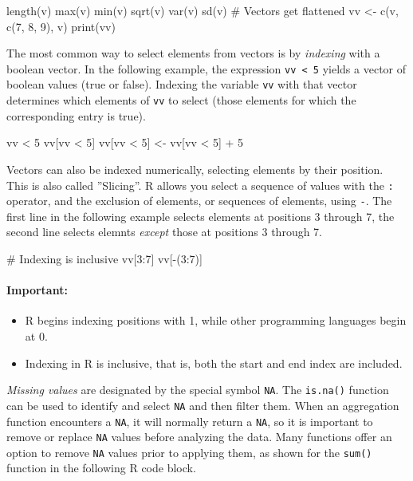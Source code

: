 \begin{samepage}
\begin{Rcode}
length(v)
max(v)
min(v)
sqrt(v)
var(v)
sd(v)
# Vectors get flattened
vv <- c(v, c(7, 8, 9), v)
print(vv)
\end{Rcode}
\end{samepage}

The most common way to select elements from vectors is by \emph{indexing} with a boolean vector. In the following example, the expression \texttt{vv < 5} yields a vector of boolean values (true or false). Indexing the variable \texttt{vv} with that vector determines which elements of \texttt{vv} to select (those elements for which the corresponding entry is true).

\begin{samepage}
\begin{Rcode}
vv < 5
vv[vv < 5]
vv[vv < 5] <- vv[vv < 5] + 5
\end{Rcode}
\end{samepage}

Vectors can also be indexed numerically, selecting elements by their position. This is also called ''Slicing''. R allows you select a sequence of values with the \texttt{:} operator, and the exclusion of elements, or sequences of elements, using \texttt{-}. The first line in the following example selects elements at positions 3 through 7, the second line selects elemnts \emph{except} those at positions 3 through 7.

\begin{samepage}
\begin{Rcode}
# Indexing is inclusive
vv[3:7]
vv[-(3:7)]
\end{Rcode}
\end{samepage}

\begin{tcolorbox}[colback=alert]
\paragraph*{Important:}
\begin{itemize}
   \item R begins indexing positions with 1, while other programming languages begin at 0.
   \item Indexing in R is inclusive, that is, both the start and end index are included.
\end{itemize}
\end{tcolorbox}

\emph{Missing values} are designated by the special symbol \texttt{NA}. The \texttt{is.na()} function can be used to identify and select \texttt{NA} and then filter them. When an aggregation function encounters a \texttt{NA}, it will normally return a \texttt{NA}, so it is important to remove or replace \texttt{NA} values before analyzing the data. Many functions offer an option to remove \texttt{NA} values prior to applying them, as shown for the \texttt{sum()} function in the following R code block. 

